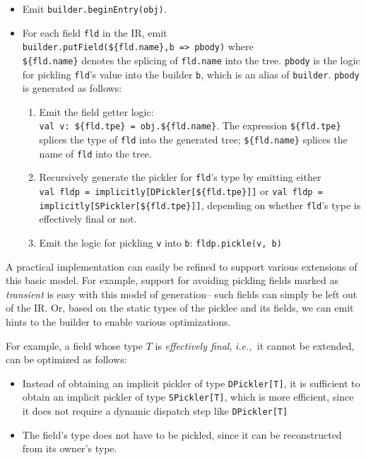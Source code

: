 \documentclass[preprint,10pt]{sigplanconf}
\theoremstyle{definition}
\theoremstyle{definition}
\newcommand{\ie}{{\em i.e.,~}}
\newcommand{\term}[1]{\mbox{\texttt{#1}}}
\begin{document}
\begin{itemize}

\item Emit \verb|builder.beginEntry(obj)|.

\item For each field \term{fld} in the IR, emit \\\verb|builder.putField(${fld.name},b => pbody)|
where \\\verb|${fld.name}| denotes the splicing of \term{fld.name}
into the tree. \term{pbody} is the logic for pickling \term{fld}'s value into
the builder \term{b}, which is an alias of \term{builder}. \term{pbody} is generated
as follows:
  \begin{enumerate}

  \item Emit the field getter logic:
  \\\verb|val v: ${fld.tpe} = obj.${fld.name}|. The
  expression \verb|${fld.tpe}| splices the type of \term{fld} into the generated
  tree; \verb|${fld.name}| splices the name of \term{fld} into the tree.

  \item Recursively generate the pickler for \term{fld}'s type by emitting either
  \\\verb|val fldp = implicitly[DPickler[${fld.tpe}]]| or \verb|val fldp = implicitly[SPickler[${fld.tpe}]]|,
  depending on whether \term{fld}'s type is effectively final or not.

  \item Emit the logic for pickling \term{v} into \term{b}: \verb|fldp.pickle(v, b)|
  \end{enumerate}
\end{itemize}

A practical implementation can easily be refined to support various extensions
of this basic model. For example, support for avoiding pickling fields marked
as {\em transient} is easy with this model of generation-- such fields can
simply be left out of the IR. Or, based on the static types of the picklee and
its fields, we can emit hints to the builder to enable various optimizations.

For example, a field whose type $T$ is {\em effectively final}, \ie it cannot
be extended, can be optimized as follows:

\begin{itemize}
\item Instead of obtaining an implicit pickler of type \term{DPickler[T]}, it is
sufficient to obtain an implicit pickler of type \term{SPickler[T]}, which is
more efficient, since it does not require a dynamic dispatch step like
\term{DPickler[T]}

\item The field's type does not have to be pickled, since it can be reconstructed
from its owner's type.
\end{itemize}
\end{document}
